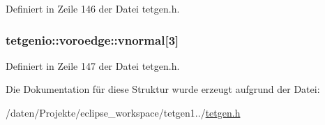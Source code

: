 Definiert in Zeile 146 der Datei tetgen.\-h.

\hypertarget{structtetgenio_1_1voroedge_afea78ad75784a868068e6d86c21531a3}{
\subsubsection[{vnormal}]{ tetgenio\-::voroedge\-::vnormal\mbox{[}3\mbox{]}}}\label{structtetgenio_1_1voroedge_afea78ad75784a868068e6d86c21531a3}


Definiert in Zeile 147 der Datei tetgen.\-h.



Die Dokumentation für diese Struktur wurde erzeugt aufgrund der Datei\-:\begin{DoxyCompactItemize}
\item 
/daten/\-Projekte/eclipse\-\_\-workspace/tetgen1../\hyperlink{tetgen_8h}{tetgen.\-h}\end{DoxyCompactItemize}
